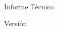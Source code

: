 \begin{titlepage}

\centering

\vspace*{3cm}

{\Huge\bfseries \TituloCaso\par}

\vspace{0.5cm}

{\Large \SubtituloCaso\par}

\vfill

{\Large Informe Técnico}

\vspace{2cm}

{\large \Autor}

\vspace{0.5cm}

{\large \Fecha}

\vfill

Versión \Version

\end{titlepage}